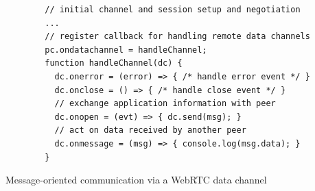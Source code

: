 \begin{listing}[H]
	\begin{verbatim}
		// initial channel and session setup and negotiation
		...
		// register callback for handling remote data channels
		pc.ondatachannel = handleChannel;
		function handleChannel(dc) {
		  dc.onerror = (error) => { /* handle error event */ }
		  dc.onclose = () => { /* handle close event */ }
		  // exchange application information with peer
		  dc.onopen = (evt) => { dc.send(msg); }
		  // act on data received by another peer
		  dc.onmessage = (msg) => { console.log(msg.data); }
		}
	\end{verbatim}
\caption[Message-oriented communication via a \gls{WebRTC} data channel]{Message-oriented communication via a \gls{WebRTC} data channel \citep[pg. 346]{grigorik2013high}}
\label{lst:p2p_webrct_data_send}
\end{listing}


